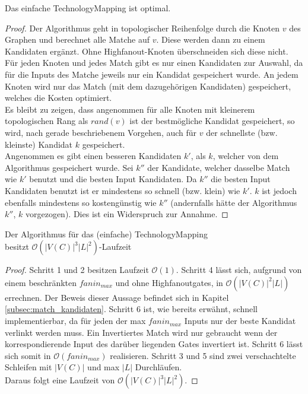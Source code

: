 \documentclass[11pt, a4paper, german]{article}
\newcommand{\TM}{TechnologyMapping }
\begin{document}
\begin{cor}
	Das einfache \TM  ist optimal. 
\end{cor}
\begin{proof}
	Der Algorithmus geht in topologischer Reihenfolge durch die Knoten $v$ des Graphen und berechnet alle Matche auf $v$. Diese werden dann zu einem Kandidaten ergänzt. 
 Ohne Highfanout-Knoten überschneiden sich diese nicht. Für jeden Knoten und jedes Match gibt es nur einen Kandidaten zur Auswahl, da für die Inputs des Matche jeweils nur ein Kandidat gespeichert wurde. An jedem Knoten wird nur das Match (mit dem dazugehörigen Kandidaten) gespeichert, welches die Kosten optimiert. \\
 Es bleibt zu zeigen, dass angenommen für alle Knoten mit kleinerem topologischen Rang als $rand(v)$ ist der bestmögliche Kandidat gespeichert, so wird, nach gerade beschriebenem Vorgehen, auch für $v$ der schnellste (bzw. kleinste) Kandidat $k$ gespeichert. \\
 Angenommen es gibt einen besseren Kandidaten $k'$, als $k$, welcher von dem Algorithmus gespeichert wurde. Sei $k''$ der Kandidate, welcher dasselbe Match wie $k'$ benutzt und die besten Input Kandidaten. Da $k''$ die besten Input Kandidaten benutzt ist er mindestens so schnell (bzw. klein) wie $k'$. $k$ ist jedoch ebenfalls mindestens so kostengünstig wie $k''$ (andernfalls hätte der Algorithmus $k''$, $k$ vorgezogen). Dies ist ein Widerspruch zur Annahme. 
\end{proof}
 
\begin{cor}{Der Algorithmus für das (einfache) \TM  \\ besitzt $\mathcal{O}(  |V(C)|^3|L|^2)$-Laufzeit}
\end{cor}
\begin{proof}
Schritt 1 und 2 besitzen Laufzeit $\mathcal{O}(1)$. Schritt 4 lässt sich, aufgrund von einem beschränkten $fanin_{max}$ und ohne Highfanoutgates, in $\mathcal{O}(|V(C)|^2|L|)$ errechnen. Der Beweis dieser Aussage befindet sich in Kapitel \ref{subsec:match_kandidaten}. Schritt 6 ist, wie bereits erwähnt, schnell implementierbar, da für jeden der max $fanin_{max}$ Inputs nur der beste Kandidat verlinkt werden muss. Ein Invertiertes Match wird nur gebraucht wenn der korrespondierende Input des darüber liegenden Gates invertiert ist. Schritt 6 lässt sich somit in  $\mathcal{O}(fanin_{max})$ realisieren. Schritt 3 und 5 sind zwei verschachtelte Schleifen mit  $|V(C)|$ und max $|L|$ Durchläufen. \\
Daraus folgt eine Laufzeit von $\mathcal{O}(  |V(C)|^3|L|^2)$.
\end{proof}
\end{document}
